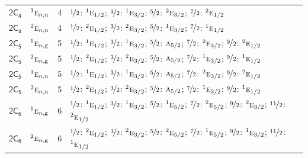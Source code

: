 \documentclass[10pt,a4paper]{article}
\numberwithin{equation}{section}
\newcommand{\grp}[1]{\mathsf{#1}}
\newcommand{\irr}[1]{\text{\normalfont\scshape #1}}
\newcommand{\conjpair}[1]{{}^{#1}}
\newcommand{\ptag}[1]{\mathrm{#1}}
\newlength{\fillwidth}\newlength{\cellwidth}\newlength{\colwidth}
\begin{document}
{\begin{longtable}{@{}llr>{\RaggedRight\arraybackslash}p{\fillwidth}@{}}
\href{2C4.pdf}{$\grp{2C_{4}}$} & $\conjpair{1}\irr{e}_{n,\ptag{u}}$ & 4 & $\nicefrac{1}{2}$: $\conjpair{1}\irr{e}_{1/2}$; $\nicefrac{3}{2}$: $\conjpair{1}\irr{e}_{3/2}$; $\nicefrac{5}{2}$: $\conjpair{2}\irr{e}_{3/2}$; $\nicefrac{7}{2}$: $\conjpair{2}\irr{e}_{1/2}$\\
\href{2C4.pdf}{$\grp{2C_{4}}$} & $\conjpair{2}\irr{e}_{n,\ptag{u}}$ & 4 & $\nicefrac{1}{2}$: $\conjpair{2}\irr{e}_{1/2}$; $\nicefrac{3}{2}$: $\conjpair{2}\irr{e}_{3/2}$; $\nicefrac{5}{2}$: $\conjpair{1}\irr{e}_{3/2}$; $\nicefrac{7}{2}$: $\conjpair{1}\irr{e}_{1/2}$\\
\href{2C5.pdf}{$\grp{2C_{5}}$} & $\conjpair{1}\irr{e}_{n,\ptag{g}}$ & 5 & $\nicefrac{1}{2}$: $\conjpair{1}\irr{e}_{1/2}$; $\nicefrac{3}{2}$: $\conjpair{1}\irr{e}_{3/2}$; $\nicefrac{5}{2}$: $\irr{a}_{5/2}$; $\nicefrac{7}{2}$: $\conjpair{2}\irr{e}_{3/2}$; $\nicefrac{9}{2}$: $\conjpair{2}\irr{e}_{1/2}$\\
\href{2C5.pdf}{$\grp{2C_{5}}$} & $\conjpair{2}\irr{e}_{n,\ptag{g}}$ & 5 & $\nicefrac{1}{2}$: $\conjpair{2}\irr{e}_{1/2}$; $\nicefrac{3}{2}$: $\conjpair{2}\irr{e}_{3/2}$; $\nicefrac{5}{2}$: $\irr{a}_{5/2}$; $\nicefrac{7}{2}$: $\conjpair{1}\irr{e}_{3/2}$; $\nicefrac{9}{2}$: $\conjpair{1}\irr{e}_{1/2}$\\
\href{2C5.pdf}{$\grp{2C_{5}}$} & $\conjpair{1}\irr{e}_{n,\ptag{u}}$ & 5 & $\nicefrac{1}{2}$: $\conjpair{1}\irr{e}_{1/2}$; $\nicefrac{3}{2}$: $\conjpair{1}\irr{e}_{3/2}$; $\nicefrac{5}{2}$: $\irr{a}_{5/2}$; $\nicefrac{7}{2}$: $\conjpair{2}\irr{e}_{3/2}$; $\nicefrac{9}{2}$: $\conjpair{2}\irr{e}_{1/2}$\\
\href{2C5.pdf}{$\grp{2C_{5}}$} & $\conjpair{2}\irr{e}_{n,\ptag{u}}$ & 5 & $\nicefrac{1}{2}$: $\conjpair{2}\irr{e}_{1/2}$; $\nicefrac{3}{2}$: $\conjpair{2}\irr{e}_{3/2}$; $\nicefrac{5}{2}$: $\irr{a}_{5/2}$; $\nicefrac{7}{2}$: $\conjpair{1}\irr{e}_{3/2}$; $\nicefrac{9}{2}$: $\conjpair{1}\irr{e}_{1/2}$\\
\href{2C6.pdf}{$\grp{2C_{6}}$} & $\conjpair{1}\irr{e}_{n,\ptag{g}}$ & 6 & $\nicefrac{1}{2}$: $\conjpair{1}\irr{e}_{1/2}$; $\nicefrac{3}{2}$: $\conjpair{1}\irr{e}_{3/2}$; $\nicefrac{5}{2}$: $\conjpair{1}\irr{e}_{5/2}$; $\nicefrac{7}{2}$: $\conjpair{2}\irr{e}_{5/2}$; $\nicefrac{9}{2}$: $\conjpair{2}\irr{e}_{3/2}$; $\nicefrac{11}{2}$: $\conjpair{2}\irr{e}_{1/2}$\\
\href{2C6.pdf}{$\grp{2C_{6}}$} & $\conjpair{2}\irr{e}_{n,\ptag{g}}$ & 6 & $\nicefrac{1}{2}$: $\conjpair{2}\irr{e}_{1/2}$; $\nicefrac{3}{2}$: $\conjpair{2}\irr{e}_{3/2}$; $\nicefrac{5}{2}$: $\conjpair{2}\irr{e}_{5/2}$; $\nicefrac{7}{2}$: $\conjpair{1}\irr{e}_{5/2}$; $\nicefrac{9}{2}$: $\conjpair{1}\irr{e}_{3/2}$; $\nicefrac{11}{2}$: $\conjpair{1}\irr{e}_{1/2}$\\

\end{longtable}}
\end{document}
